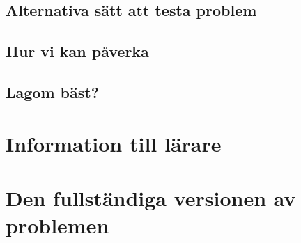 \documentclass[11pt,a4paper]{article}
\begin{document}
    \subsection{Alternativa sätt att testa problem}
        
        
    \subsection{Hur vi kan påverka}
        

    \subsection{Lagom bäst?}
        
        

\newpage
\begin{thebibliography}{3}
    
\end{thebibliography}

\newpage
{}
\appendix

\section{Information till lärare}

\section{Den fullständiga versionen av problemen}
\end{document}
